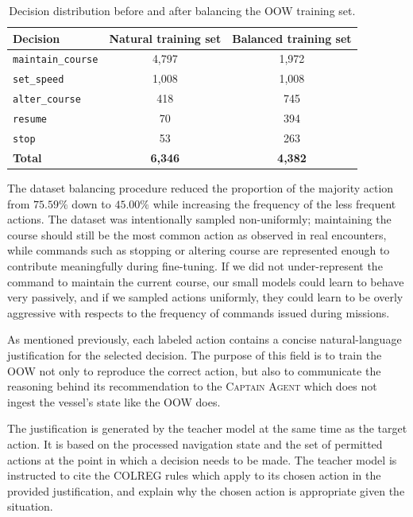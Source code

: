 \documentclass[10pt]{reportMaster}
\begin{document}
\begin{table}[htbp!]
    \centering
    \begin{tabular}{lcc}
        \hline
        \textbf{Decision} &
        \textbf{Natural training set} &
        \textbf{Balanced training set} \\
        \hline

        \texttt{maintain\_course} & 4,797 & 1,972 \\
        \texttt{set\_speed}       & 1,008 & 1,008 \\
        \texttt{alter\_course}    & 418   & 745 \\
        \texttt{resume}           & 70    & 394 \\
        \texttt{stop}             & 53    & 263 \\

        \hline
        \textbf{Total} &
        \textbf{6,346} &
        \textbf{4,382} \\
        \hline
    \end{tabular}
    \caption{Decision distribution before and after balancing the OOW training set.}
    \label{tab:oow_decision_balance}
\end{table}


The dataset balancing procedure reduced the proportion of the majority action from $75.59\%$ down to $45.00\%$ while increasing the frequency of the less frequent actions. The dataset was intentionally sampled non-uniformly; maintaining the course should still be the most common action as observed in real encounters, while commands such as stopping or altering course are represented enough to contribute meaningfully during fine-tuning. If we did not under-represent the command to maintain the current course, our small models could learn to behave very passively, and if we sampled actions uniformly, they could learn to be overly aggressive with respects to the frequency of commands issued during missions. 

As mentioned previously, each labeled action contains a concise natural-language justification for the selected decision. The purpose of this field is to train the OOW not only to reproduce the correct action, but also to communicate the reasoning behind its recommendation to the \textsc{Captain Agent} which does not ingest the vessel's state like the OOW does. 

The justification is generated by the teacher model at the same time as the target action. It is based on the processed navigation state and the set of permitted actions at the point in which a decision needs to be made. The teacher model is instructed to cite the COLREG rules which apply to its chosen action in the provided justification, and explain why the chosen action is appropriate given the situation.
\end{document}
